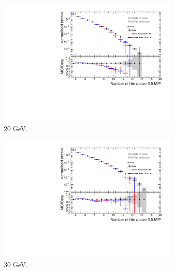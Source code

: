 \begin{figure}[t]
\begin{subfigure}[t]{0.45\textwidth}
		\includegraphics[width=1\textwidth]{chap5/fig_AHCAL_timing/Electrons/Comparison_SimData_Electrons_nHits_20GeV.pdf}
		\caption{20 GeV.}\label{fig:elec_sim_data_nHits_20GeV}
	\end{subfigure}
	\hfill
	\begin{subfigure}[t]{0.45\textwidth}
		\centering
		\includegraphics[width=1\textwidth]{chap5/fig_AHCAL_timing/Electrons/Comparison_SimData_Electrons_nHits_30GeV.pdf}
		\caption{30 GeV.}\label{fig:elec_sim_data_nHits_30GeV}
	\end{subfigure}
	\hfill
	\begin{subfigure}[t]{0.45\textwidth}
		\centering

\end{subfigure}
\end{figure}
